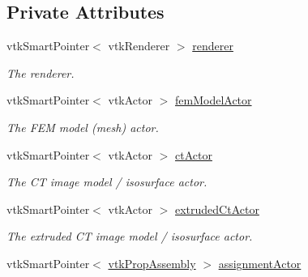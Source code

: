 \subsection*{Private Attributes}
\begin{DoxyCompactItemize}
\item 
\hypertarget{classgui_1_1_main_window_a8fc767f398e4bebf05af19574db9fb0e}{
vtkSmartPointer$<$ vtkRenderer $>$ \hyperlink{classgui_1_1_main_window_a8fc767f398e4bebf05af19574db9fb0e}{renderer}}
\label{classgui_1_1_main_window_a8fc767f398e4bebf05af19574db9fb0e}

\begin{DoxyCompactList}\small\item\em The renderer. \item\end{DoxyCompactList}\item 
\hypertarget{classgui_1_1_main_window_a2e5976958b9de74939664b970a1c6be1}{
vtkSmartPointer$<$ vtkActor $>$ \hyperlink{classgui_1_1_main_window_a2e5976958b9de74939664b970a1c6be1}{femModelActor}}
\label{classgui_1_1_main_window_a2e5976958b9de74939664b970a1c6be1}

\begin{DoxyCompactList}\small\item\em The FEM model (mesh) actor. \item\end{DoxyCompactList}\item 
\hypertarget{classgui_1_1_main_window_a49c55c30152f0eb436de815d2ab65c4d}{
vtkSmartPointer$<$ vtkActor $>$ \hyperlink{classgui_1_1_main_window_a49c55c30152f0eb436de815d2ab65c4d}{ctActor}}
\label{classgui_1_1_main_window_a49c55c30152f0eb436de815d2ab65c4d}

\begin{DoxyCompactList}\small\item\em The CT image model / isosurface actor. \item\end{DoxyCompactList}\item 
\hypertarget{classgui_1_1_main_window_aaa081fb46c3e494dbdba6f15b1a54095}{
vtkSmartPointer$<$ vtkActor $>$ \hyperlink{classgui_1_1_main_window_aaa081fb46c3e494dbdba6f15b1a54095}{extrudedCtActor}}
\label{classgui_1_1_main_window_aaa081fb46c3e494dbdba6f15b1a54095}

\begin{DoxyCompactList}\small\item\em The extruded CT image model / isosurface actor. \item\end{DoxyCompactList}\item 
\hypertarget{classgui_1_1_main_window_a55e9ef04df1730c3c614f6ed1ed648de}{
vtkSmartPointer$<$ \hyperlink{classvtk_prop_assembly}{vtkPropAssembly} $>$ \hyperlink{classgui_1_1_main_window_a55e9ef04df1730c3c614f6ed1ed648de}{assignmentActor}}
\label{classgui_1_1_main_window_a55e9ef04df1730c3c614f6ed1ed648de}


\end{DoxyCompactItemize}
